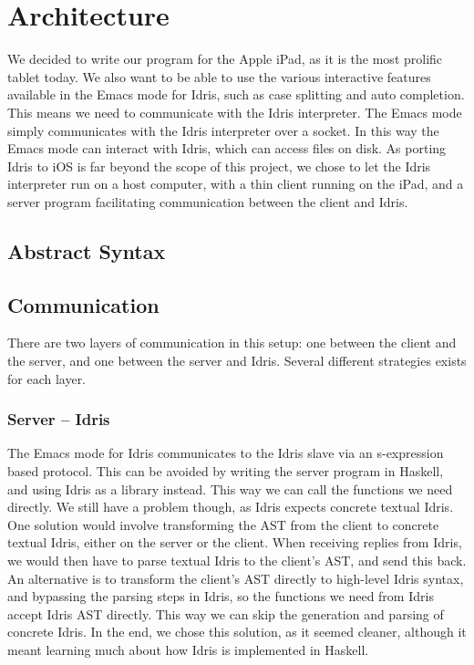 \section{Architecture}
\label{sec:Architecture}

We decided to write our program for the Apple iPad, as it is the most prolific
tablet today. We also want to be able to use the various interactive features
available in the Emacs mode for Idris, such as case
splitting and auto completion. This means we need to communicate with the Idris
interpreter. The Emacs mode simply communicates with the Idris interpreter over
a socket. In this way the Emacs mode can interact with Idris, which can access
files on disk. As porting Idris to iOS is far beyond the scope of this project,
we chose to let the Idris interpreter run on a host computer, with a thin 
client running on the iPad, and a server program facilitating communication 
between the client and Idris.

\subsection{Abstract Syntax}
\label{subsec:AbstractSyntax}



\subsection{Communication}
There are two layers of communication in this setup: one between the client and
the server, and one between the server and Idris. Several different strategies
exists for each layer. 

\subsubsection{Server -- Idris}
The Emacs mode for Idris communicates to the Idris slave via an s-expression
based protocol. This can be avoided by writing the server program in
Haskell, and using Idris as a library instead. This way we can call the
functions we need directly. We still have a problem though, as Idris expects
concrete textual Idris. One solution would involve transforming the AST from 
the client to concrete textual Idris, either on the server or the client. When
receiving replies from Idris, we would then have to parse textual Idris to the
client's AST\@, and send this back. An alternative is to transform the 
client's AST directly to high-level Idris syntax, and bypassing the parsing
steps in Idris, so the functions we need from Idris accept Idris AST directly.
This way we can skip the generation and parsing of concrete Idris. In the end,
we chose this solution, as it seemed cleaner, although it meant learning much
about how Idris is implemented in Haskell.

